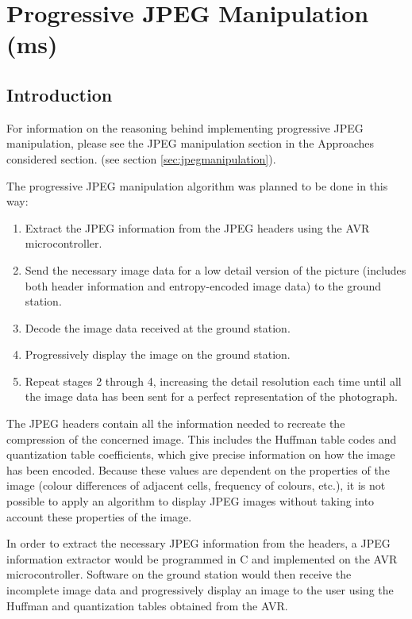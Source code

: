 \section{Progressive JPEG Manipulation (ms)}
\label{sec:implementation_progressive_jpeg}

\subsection{Introduction}

For information on the reasoning behind implementing 
progressive JPEG manipulation, please see 
the JPEG manipulation section in the 
Approaches considered section. (see section \ref{sec:jpegmanipulation}).

The progressive JPEG manipulation algorithm was planned to be
done in this way:

\begin{enumerate}
	\item Extract the JPEG information from the JPEG headers 
		using the AVR microcontroller.
	\item Send the necessary image data for a low detail
	         version of the picture (includes both header information
		and entropy-encoded image data) to the ground station.
	\item Decode the image data received at the ground station.
	\item Progressively display the image on the ground station.
	\item Repeat stages 2 through 4, increasing the detail resolution 
		each time until all the image data has been sent for a perfect 
		representation of the photograph.
\end{enumerate}

The JPEG headers contain all the information needed to
recreate the compression of the concerned image. This includes
the Huffman table codes and quantization table coefficients,
which give precise information on how the image has been encoded.
Because these values are dependent on the properties of the image
(colour differences of adjacent cells, frequency of colours, etc.), it
is not possible to apply an algorithm to display JPEG images without
taking into account these properties of the image.

In order to extract the necessary JPEG information from
the headers, a JPEG information extractor would be
programmed in C and implemented on the AVR microcontroller.
Software on the ground station would then 
receive the incomplete image data and
progressively display an image to the user using the Huffman
and quantization tables obtained from the AVR.

